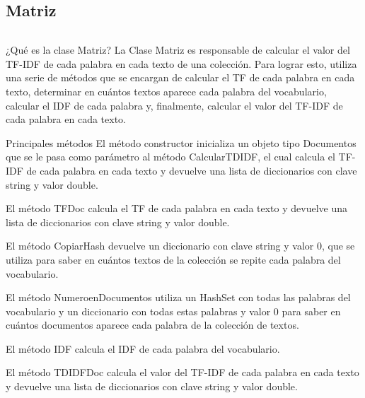 \documentclass[11pt]{beamer}
\begin{document}
	\subsection {Matriz}
	\begin{frame}
		\begin{columns}
			\begin{column}{.4\textwidth}
				\tableofcontents[sections={1-2},currentsection, currentsubsection]
			\end{column}
			\begin{column}{.4\textwidth}
				\tableofcontents[sections={3-4},currentsection , currentsubsection]
			\end{column}
		\end{columns}
	\end{frame}
	\begin{frame}{¿Qué es la clase Matriz?}
		\justifying
		La Clase Matriz es responsable de calcular el valor del TF-IDF de cada palabra en cada texto de una colección. Para lograr esto, utiliza una serie de métodos que se encargan de calcular el TF de cada palabra en cada texto, determinar en cuántos textos aparece cada palabra del vocabulario, calcular el IDF de cada palabra y, finalmente, calcular el valor del TF-IDF de cada palabra en cada texto.
	\end{frame}
	\begin{frame}{Principales métodos}
		\justifying
		El método constructor inicializa un objeto tipo Documentos que se le pasa como parámetro al método CalcularTDIDF, el cual calcula el TF-IDF de cada palabra en cada texto y devuelve una lista de diccionarios con clave string y valor double.
		
		El método TFDoc calcula el TF de cada palabra en cada texto y devuelve una lista de diccionarios con clave string y valor double.
		
		El método CopiarHash devuelve un diccionario con clave string y valor 0, que se utiliza para saber en cuántos textos de la colección se repite cada palabra del vocabulario.
		
		El método NumeroenDocumentos utiliza un HashSet con todas las palabras del vocabulario y un diccionario con todas estas palabras y valor 0 para saber en cuántos documentos aparece cada palabra de la colección de textos.
		
		El método IDF calcula el IDF de cada palabra del vocabulario.
		
		El método TDIDFDoc calcula el valor del TF-IDF de cada palabra en cada texto y devuelve una lista de diccionarios con clave string y valor double.
		
		
	\end{frame}
\end{document}
